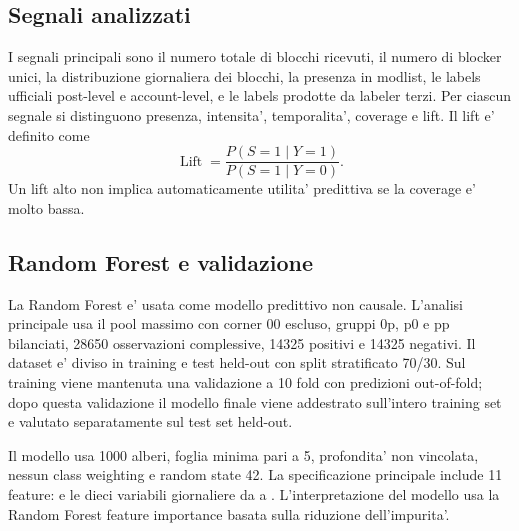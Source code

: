 \subsection{Segnali analizzati}

I segnali principali sono il numero totale di blocchi ricevuti, il numero di blocker unici, la distribuzione giornaliera dei blocchi, la presenza in modlist, le labels ufficiali post-level e account-level, e le labels prodotte da labeler terzi. Per ciascun segnale si distinguono presenza, intensita', temporalita', coverage e lift. Il lift e' definito come
\[
\operatorname{Lift}=\frac{P(S=1\mid Y=1)}{P(S=1\mid Y=0)}.
\]
Un lift alto non implica automaticamente utilita' predittiva se la coverage e' molto bassa.

\subsection{Random Forest e validazione}

La Random Forest e' usata come modello predittivo non causale. L'analisi principale usa il pool massimo con corner 00 escluso, gruppi 0p, p0 e pp bilanciati, \num{28650} osservazioni complessive, \num{14325} positivi e \num{14325} negativi. Il dataset e' diviso in training e test held-out con split stratificato 70/30. Sul training viene mantenuta una validazione  a 10 fold con predizioni out-of-fold; dopo questa validazione il modello finale viene addestrato sull'intero training set e valutato separatamente sul test set held-out.

Il modello usa \num{1000} alberi, foglia minima pari a 5, profondita' non vincolata, nessun class weighting e random state 42. La specificazione principale include 11 feature:  e le dieci variabili giornaliere da  a . L'interpretazione del modello usa la Random Forest feature importance basata sulla riduzione dell'impurita'.
